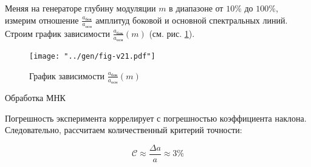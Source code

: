 Меняя на генераторе глубину модуляции $m$ в диапазоне от $10\%$ до
$100\%$, измерим отношение $\frac{a_{\text{бок}}}{a_{\text{осн}}}$ амплитуд боковой и основной спектральных линий. Строим график зависимости $\frac{a_{\text{бок}}}{a_{\text{осн}}}(m)$ (см. рис. \ref{fig:v21}).

\begin{figure}[H]
	\begin{minipage}[B]{.5\textwidth}
			\centering
			\texttt{[image: "../gen/fig-v21.pdf"]}
	\end{minipage}%
	\begin{minipage}[B]{.5\textwidth}
		\begin{table}[H]
			\centering
			\footnotesize
			
		\end{table}
	\end{minipage}
	\caption{График зависимости $\frac{a_{\text{бок}}}{a_{\text{осн}}}(m)$}
	\label{fig:v21}
\end{figure}


\begin{table}[H]
	\centering
	\footnotesize
	
	\caption{Обработка МНК}
	\label{tab:v21-mnk}
\end{table}

Погрешность эксперимента коррелирует с погрешностью коэффициента наклона. Следовательно, рассчитаем количественный критерий точности:

$$\mathcal{C} \approx \frac{\Delta a}{a} \approx 3 \% $$

